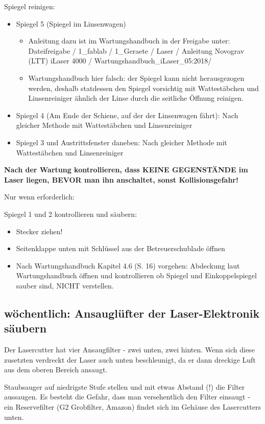 \documentclass{\basedir/fablab-document}
\begin{document}
	Spiegel reinigen:
	\begin{itemize}
		\item Spiegel 5 (Spiegel im Linsenwagen)
		\begin{itemize}
			\item 	Anleitung dazu ist im Wartungshandbuch in der Freigabe unter: Dateifreigabe / 1\_fablab / 1\_Geraete / Laser / Anleitung Novograv (LTT) iLaser 4000 / Wartungshandbuch\_iLaser\_05:2018/
			\item 	Wartungshandbuch hier falsch: der Spiegel kann nicht herausgezogen werden, deshalb statdessen den Spiegel vorsichtig mit Wattestäbchen und Linsenreiniger ähnlich der Linse durch die seitliche Öffnung reinigen.
		\end{itemize}
		\item Spiegel 4 (Am Ende der Schiene, auf der der Linsenwagen fährt): Nach gleicher Methode mit Wattestäbchen und Linsenreiniger
		\item Spiegel 3 und Austrittsfenster daneben: Nach gleicher Methode mit Wattestäbchen und Linsenreiniger
	\end{itemize}

\textbf{Nach der Wartung kontrollieren, dass KEINE GEGENSTÄNDE im Laser liegen, BEVOR man ihn anschaltet, sonst Kollisionsgefahr!}

	Nur wenn erforderlich:

	Spiegel 1 und 2 kontrollieren und säubern:
	\begin{itemize}
		\item Stecker ziehen!
		\item Seitenklappe unten mit Schlüssel aus der Betreuerschublade öffnen
		\item Nach Wartungshandbuch Kapitel 4.6 (S. 16) vorgehen: Abdeckung laut Wartungshandbuch öffnen und kontrollieren ob Spiegel und Einkoppelspiegel sauber sind, NICHT verstellen.
	\end{itemize}


\subsection{wöchentlich: Ansauglüfter der Laser-Elektronik säubern}
	Der Lasercutter hat vier Ansaugfilter - zwei unten, zwei hinten. Wenn sich diese zusetzten verdreckt der Laser auch unten beschleunigt, da er dann dreckige Luft aus dem oberen Bereich ansaugt.

	 Staubsauger auf niedrigste Stufe stellen und mit etwas Abstand (!) die Filter aussaugen. Es besteht die Gefahr, dass man versehentlich den Filter einsaugt - ein Reservefilter (G2 Grobfilter, Amazon) findet sich im Gehäuse des Lasercutters unten.
\end{document}
